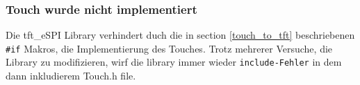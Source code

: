             \subsubsection{Touch wurde nicht implementiert}
            Die tft\_eSPI Library verhindert duch die in section \ref{touch_to_tft} 
            beschriebenen \lstinline{#if} Makros, die Implementierung des Touches.
            Trotz mehrerer Versuche, die Library zu modifizieren, wirf die library
            immer wieder \lstinline{include-Fehler} in dem dann inkludierem Touch.h file. \\~\\
            

            

